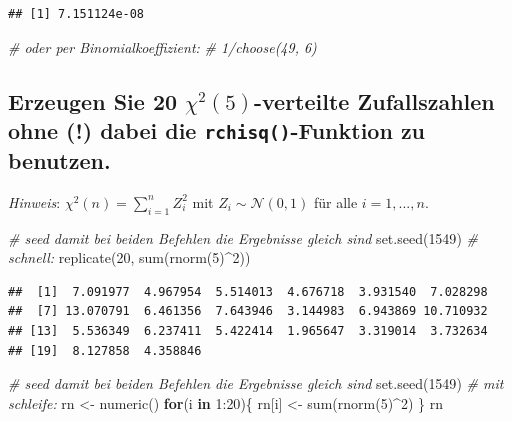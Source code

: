 \documentclass[12pt,a4paper]{article}
\newenvironment{Shaded}{\begin{snugshade}}{\end{snugshade}}
\newcommand{\CommentTok}[1]{\textcolor[rgb]{0.56,0.35,0.01}{\textit{#1}}}
\newcommand{\ControlFlowTok}[1]{\textcolor[rgb]{0.13,0.29,0.53}{\textbf{#1}}}
\newcommand{\DecValTok}[1]{\textcolor[rgb]{0.00,0.00,0.81}{#1}}
\newcommand{\FunctionTok}[1]{\textcolor[rgb]{0.00,0.00,0.00}{#1}}
\newcommand{\NormalTok}[1]{#1}
\newcommand{\OtherTok}[1]{\textcolor[rgb]{0.56,0.35,0.01}{#1}}
\newcommand{\SpecialCharTok}[1]{\textcolor[rgb]{0.00,0.00,0.00}{#1}}
\begin{document}
\begin{verbatim}
## [1] 7.151124e-08
\end{verbatim}

\begin{Shaded}
\begin{Highlighting}[]
    \CommentTok{\# oder per Binomialkoeffizient:}
    \CommentTok{\# 1/choose(49, 6)}
\end{Highlighting}
\end{Shaded}

\hypertarget{erzeugen-sie-20-chi25-verteilte-zufallszahlen-ohne-dabei-die-rchisq-funktion-zu-benutzen.}{%
\subsection{\texorpdfstring{Erzeugen Sie 20 \(\chi^2(5)\)-verteilte
Zufallszahlen ohne (!) dabei die \texttt{rchisq()}-Funktion zu
benutzen.}{Erzeugen Sie 20 \textbackslash chi\^{}2(5)-verteilte Zufallszahlen ohne (!) dabei die rchisq()-Funktion zu benutzen.}}\label{erzeugen-sie-20-chi25-verteilte-zufallszahlen-ohne-dabei-die-rchisq-funktion-zu-benutzen.}}

\emph{Hinweis}: \(\chi^2(n)=\sum_{i=1}^n Z_i^2\) mit
\(Z_i\sim\mathcal{N}(0,1)\) für alle \(i=1,...,n\).

\begin{Shaded}
\begin{Highlighting}[]
    \CommentTok{\# seed damit bei beiden Befehlen die Ergebnisse gleich sind}
    \FunctionTok{set.seed}\NormalTok{(}\DecValTok{1549}\NormalTok{) }
    \CommentTok{\# schnell: }
    \FunctionTok{replicate}\NormalTok{(}\DecValTok{20}\NormalTok{, }\FunctionTok{sum}\NormalTok{(}\FunctionTok{rnorm}\NormalTok{(}\DecValTok{5}\NormalTok{)}\SpecialCharTok{\^{}}\DecValTok{2}\NormalTok{))}
\end{Highlighting}
\end{Shaded}

\begin{verbatim}
##  [1]  7.091977  4.967954  5.514013  4.676718  3.931540  7.028298
##  [7] 13.070791  6.461356  7.643946  3.144983  6.943869 10.710932
## [13]  5.536349  6.237411  5.422414  1.965647  3.319014  3.732634
## [19]  8.127858  4.358846
\end{verbatim}

\begin{Shaded}
\begin{Highlighting}[]
    \CommentTok{\# seed damit bei beiden Befehlen die Ergebnisse gleich sind}
    \FunctionTok{set.seed}\NormalTok{(}\DecValTok{1549}\NormalTok{)}
    \CommentTok{\# mit schleife:}
\NormalTok{    rn }\OtherTok{\textless{}{-}} \FunctionTok{numeric}\NormalTok{()}
    \ControlFlowTok{for}\NormalTok{(i }\ControlFlowTok{in} \DecValTok{1}\SpecialCharTok{:}\DecValTok{20}\NormalTok{)\{}
\NormalTok{      rn[i] }\OtherTok{\textless{}{-}} \FunctionTok{sum}\NormalTok{(}\FunctionTok{rnorm}\NormalTok{(}\DecValTok{5}\NormalTok{)}\SpecialCharTok{\^{}}\DecValTok{2}\NormalTok{)}
\NormalTok{    \}}
\NormalTok{    rn}
\end{Highlighting}
\end{Shaded}
\end{document}
